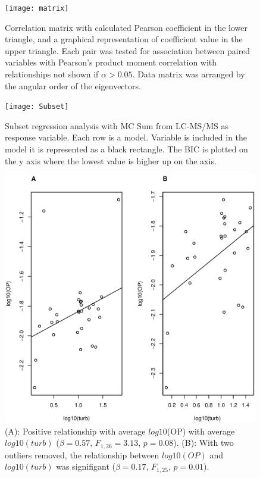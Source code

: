 \begin{figure}

  \texttt{[image: matrix]}
  \vspace*{-15mm}
  \caption{
  Correlation matrix with calculated Pearson coefficient in the lower triangle, and a graphical representation of coefficient value in the upper triangle. Each pair was tested for association between paired variables with Pearson's product moment correlation with relationships not shown if $\alpha>0.05$. Data matrix was arranged by the angular order of the eigenvectors.}
  \label{matrix}
\end{figure}


\begin{figure}[!ht]
  \texttt{[image: Subset]}
  \caption{Subset regression analysis with MC Sum from LC-MS/MS as response variable. Each row is a model. Variable is included in the model it is represented as a black rectangle. The BIC is plotted on the y axis where the lowest value is higher up on the axis.}
  \label{subset}
\end{figure}

\begin{figure}
\includegraphics[width=\textwidth, height=11cm]{figures/plot1}
\caption{
(A): Positive relationship with average $log10$(OP) with average $log10(turb)$ ($\beta=0.57$, $F_{{1,26}}=3.13$, $p=0.08$).
(B): With two outliers removed, the relationship between $log10(OP)$ and $log10(turb)$ was signifigant  ($\beta=0.17$, $F_{{1,25}}$, $p=0.01$).
}
\label{fig:plot1}
\end{figure}

